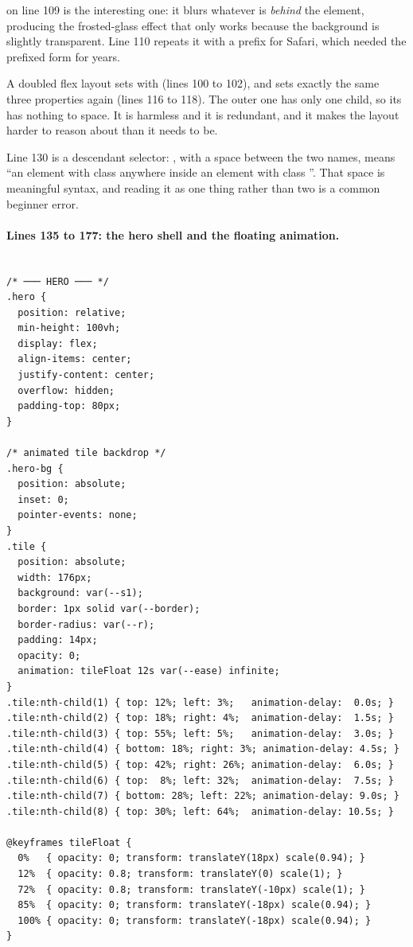  on line 109 is the interesting one: it blurs
whatever is \emph{behind} the element, producing the frosted-glass effect that only
works because the background is slightly transparent. Line 110 repeats it with a
 prefix for Safari, which needed the prefixed form for years.

\begin{honest}{A doubled flex layout}
 sets  with 
(lines 100 to 102), and  sets exactly the same three properties
again (lines 116 to 118). The outer one has only one child, so its
 has nothing to space. It is harmless and it is redundant, and
it makes the layout harder to reason about than it needs to be.
\end{honest}

Line 130 is a descendant selector: , with a space between
the two names, means ``an element with class  anywhere inside an
element with class ''. That space is meaningful syntax, and reading
it as one thing rather than two is a common beginner error.

\paragraph{Lines 135 to 177: the hero shell and the floating animation.}

\begin{lstlisting}[firstnumber=134,caption={\file{css/site.css}, lines 134--177}]

/* ─── HERO ─── */
.hero {
  position: relative;
  min-height: 100vh;
  display: flex;
  align-items: center;
  justify-content: center;
  overflow: hidden;
  padding-top: 80px;
}

/* animated tile backdrop */
.hero-bg {
  position: absolute;
  inset: 0;
  pointer-events: none;
}
.tile {
  position: absolute;
  width: 176px;
  background: var(--s1);
  border: 1px solid var(--border);
  border-radius: var(--r);
  padding: 14px;
  opacity: 0;
  animation: tileFloat 12s var(--ease) infinite;
}
.tile:nth-child(1) { top: 12%; left: 3%;   animation-delay:  0.0s; }
.tile:nth-child(2) { top: 18%; right: 4%;  animation-delay:  1.5s; }
.tile:nth-child(3) { top: 55%; left: 5%;   animation-delay:  3.0s; }
.tile:nth-child(4) { bottom: 18%; right: 3%; animation-delay: 4.5s; }
.tile:nth-child(5) { top: 42%; right: 26%; animation-delay:  6.0s; }
.tile:nth-child(6) { top:  8%; left: 32%;  animation-delay:  7.5s; }
.tile:nth-child(7) { bottom: 28%; left: 22%; animation-delay: 9.0s; }
.tile:nth-child(8) { top: 30%; left: 64%;  animation-delay: 10.5s; }

@keyframes tileFloat {
  0%   { opacity: 0; transform: translateY(18px) scale(0.94); }
  12%  { opacity: 0.8; transform: translateY(0) scale(1); }
  72%  { opacity: 0.8; transform: translateY(-10px) scale(1); }
  85%  { opacity: 0; transform: translateY(-18px) scale(0.94); }
  100% { opacity: 0; transform: translateY(-18px) scale(0.94); }
}
\end{lstlisting}

